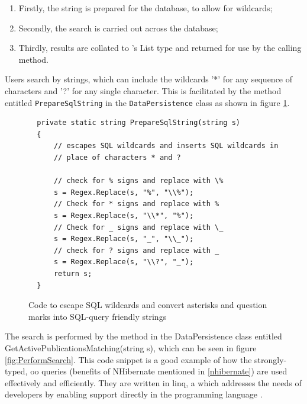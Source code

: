 \begin{enumerate}
	\item Firstly, the string is prepared for the database, to allow for wildcards;
	\item Secondly, the search is carried out across the database;
	\item Thirdly, results are collated to \cs's List type and returned for use by the calling method.
\end{enumerate}

Users search by strings, which can include the wildcards '*' for any sequence of characters and '?' for any single character.
This is facilitated by the method entitled \texttt{PrepareSqlString} in the \texttt{DataPersistence} class as shown in figure \ref{fig:SQLsearchEscape}.

\begin{figure}
	\begin{center}
			\lstset{language=CSharp} 
			\begin{lstlisting}
  private static string PrepareSqlString(string s)
  {
      // escapes SQL wildcards and inserts SQL wildcards in
      // place of characters * and ?

      // check for % signs and replace with \%
      s = Regex.Replace(s, "%", "\\%");
      // Check for * signs and replace with %
      s = Regex.Replace(s, "\\*", "%");
      // Check for _ signs and replace with \_
      s = Regex.Replace(s, "_", "\\_");
      // check for ? signs and replace with _
      s = Regex.Replace(s, "\\?", "_");
      return s;
  }
  		\end{lstlisting}
		\caption{Code to escape SQL wildcards and convert asterisks and question marks into SQL-query friendly strings}
		\label{fig:SQLsearchEscape}
	\end{center}
\end{figure}

The search is performed by the method in the DataPersistence class entitled GetActivePublicationsMatching(string s), which can be seen in figure \ref{fig:PerformSearch}.  This code snippet is a good example of how the strongly-typed, \gls{oo} queries (benefits of NHibernate mentioned in \ref{nhibernate}) are used effectively and efficiently.  They are written in \gls{linq}, a which addresses the needs of developers by enabling support directly in the programming language \cite{csUnleashed}.

